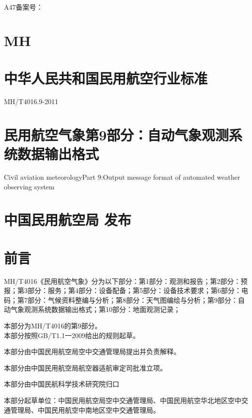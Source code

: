 \documentclass[
  10
]{article}
\author{}
\date{}
\begin{document}
A47备案号：

\section{MH}\label{mh}

\section{中华人民共和国民用航空行业标准}\label{ux4e2dux534eux4ebaux6c11ux5171ux548cux56fdux6c11ux7528ux822aux7a7aux884cux4e1aux6807ux51c6}

MH/T4016.9-2011

\section{民用航空气象第9部分：自动气象观测系统数据输出格式}\label{ux6c11ux7528ux822aux7a7aux6c14ux8c61ux7b2c9ux90e8ux5206ux81eaux52a8ux6c14ux8c61ux89c2ux6d4bux7cfbux7edfux6570ux636eux8f93ux51faux683cux5f0f}

Civil aviation meteorologyPart 9:Output message format of automated
weather observing system

\section{中国民用航空局
发布}\label{ux4e2dux56fdux6c11ux7528ux822aux7a7aux5c40-ux53d1ux5e03}

\section{前言}\label{ux524dux8a00}

MH/T4016《民用航空气象》分为以下部分：第1部分：观测和报告；第2部分：预报；第3部分：服务；第4部分：设备配备；第5部分：设备技术要求；第6部分：电码；第7部分：气候资料整编与分析；第8部分：天气图编绘与分析；第9部分：自动气象观测系统数据输出格式；第10部分：地面观测记录；

本部分为MH/T4016的第9部分。\\
本部分按照GB/T1.1一2009给出的规则起草。

本部分由中国民用航空局空中交通管理局提出并负责解释。

本部分由中国民用航空局航空器适航审定司批准立项。

本部分由中国民航科学技术研究院归口

本部分起草单位：中国民用航空局空中交通管理局、中国民用航空华北地区空中交通管理局、中国民用航空中南地区空中交通管理局。
\end{document}
